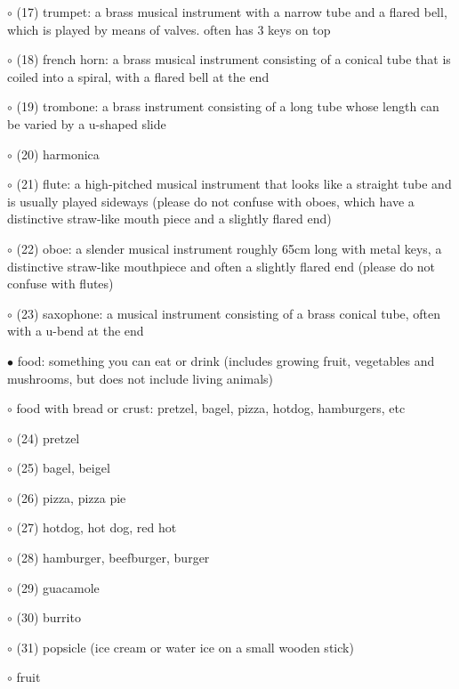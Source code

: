 \noindent \leftskip=0.5cm $\circ$ (17) trumpet: a brass musical instrument with a narrow tube and a flared bell, which is played by means of valves. often has 3 keys on top

\noindent \leftskip=0.5cm $\circ$ (18) french horn: a brass musical instrument consisting of a conical tube that is coiled into a spiral, with a flared bell at the end

\noindent \leftskip=0.5cm $\circ$ (19) trombone: a brass instrument consisting of a long tube whose length can be varied by a u-shaped slide

\noindent \leftskip=0.5cm $\circ$ (20) harmonica

\noindent \leftskip=0.5cm $\circ$ (21) flute: a high-pitched musical instrument that looks like a straight tube and is usually played sideways (please do not confuse with oboes, which have a distinctive straw-like mouth piece and a slightly flared end)

\noindent \leftskip=0.5cm $\circ$ (22) oboe: a slender musical instrument roughly 65cm long with metal keys, a distinctive straw-like mouthpiece and often a slightly flared end (please do not confuse with flutes)

\noindent \leftskip=0.5cm $\circ$ (23) saxophone: a musical instrument consisting of a brass conical tube, often with a u-bend at the end

\noindent \leftskip=0.0cm $\bullet$ food: something you can eat or drink (includes growing fruit, vegetables and mushrooms, but does not include living animals)

\noindent \leftskip=0.25cm $\circ$ food with bread or crust: pretzel, bagel, pizza, hotdog, hamburgers, etc

\noindent \leftskip=0.5cm $\circ$ (24) pretzel

\noindent \leftskip=0.5cm $\circ$ (25) bagel, beigel

\noindent \leftskip=0.5cm $\circ$ (26) pizza, pizza pie

\noindent \leftskip=0.5cm $\circ$ (27) hotdog, hot dog, red hot

\noindent \leftskip=0.5cm $\circ$ (28) hamburger, beefburger, burger

\noindent \leftskip=0.25cm $\circ$ (29) guacamole

\noindent \leftskip=0.25cm $\circ$ (30) burrito

\noindent \leftskip=0.25cm $\circ$ (31) popsicle (ice cream or water ice on a small wooden stick)

\noindent \leftskip=0.25cm $\circ$ fruit

